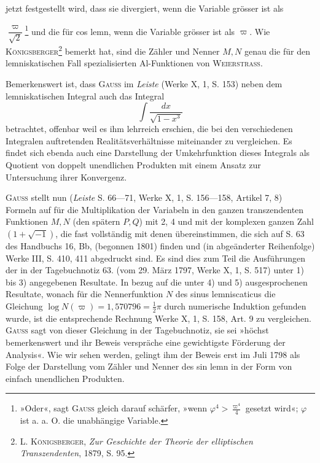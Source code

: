 jetzt festgestellt wird, dass sie divergiert, wenn die Variable grösser ist als\par
\clearpage{}
\noindent\(\dfrac{\varpi}{\sqrt2}\)\footnote{»Oder«, sagt \textsc{Gauss} gleich darauf schärfer, »wenn \(\varphi^4>\frac{\varpi^4}4\) gesetzt wird«; \(\varphi\) ist a. a. O. die unabhängige
Variable.}
und die für cos lemn, wenn die Variable grösser ist als \(\varpi\). Wie \textsc{Königsberger}\footnote{L. \textsc{Königsberger}, \textit{Zur Geschichte der Theorie der elliptischen Transzendenten}, 1879, S. 95.}
bemerkt hat, sind die Zähler und Nenner \(M,N\) genau die für den
lemniskatischen Fall spezialisierten Al-Funktionen von \textsc{Weierstrass}.

Bemerkenswert ist, dass \textsc{Gauss} im \textit{Leiste} (Werke X, 1, S. 153) neben
dem lemniskatischen Integral auch das Integral
\[
\int\frac{dx}{\sqrt{1-x^3}}
\]
betrachtet, offenbar weil es ihm lehrreich erschien, die bei den verschiedenen
Integralen auftretenden Realitätsverhältnisse miteinander zu vergleichen. Es
findet sich ebenda auch eine Darstellung der Umkehrfunktion dieses Integrals
als Quotient von doppelt unendlichen Produkten mit einem Ansatz zur Untersuchung
ihrer Konvergenz.

\textsc{Gauss} stellt nun (\textit{Leiste} S. 66—71, Werke X, 1, S. 156—158, Artikel 7, 8)
Formeln auf für die Multiplikation der Variabeln in den ganzen transzendenten
Funktionen \(M,N\) (den spätern \(P,Q\)) mit 2, 4 und mit der komplexen ganzen
Zahl \((1+\sqrt{-1})\), die fast vollständig mit denen übereinstimmen, die sich auf
S. 63 des Handbuchs 16, Bb, (begonnen 1801) finden und (in abgeänderter Reihenfolge)
Werke III, S. 410, 411 abgedruckt sind. Es sind dies zum Teil die
Ausführungen der in der Tagebuchnotiz 63. (vom 29. März 1797, Werke X, 1,
S. 517) unter 1) bis 3) angegebenen Resultate. In bezug auf die unter 4) und
5) ausgesprochenen Resultate, wonach für die Nennerfunktion \(N\) des sinus
lemniscaticus die Gleichung \(\log N(\varpi)=1{,}570796=\frac12\pi\) durch numerische Induktion
gefunden wurde, ist die entsprechende Rechnung Werke X, 1, S. 158,
Art. 9 zu vergleichen. \textsc{Gauss} sagt von dieser Gleichung in der Tagebuchnotiz,
sie sei »höchst bemerkenswert und ihr Beweis verspräche eine gewichtigste
Förderung der Analysis«. Wie wir sehen werden, gelingt ihm der Beweis
erst im Juli 1798 als Folge der Darstellung vom Zähler und Nenner des
sin lemn in der Form von einfach unendlichen Produkten.

